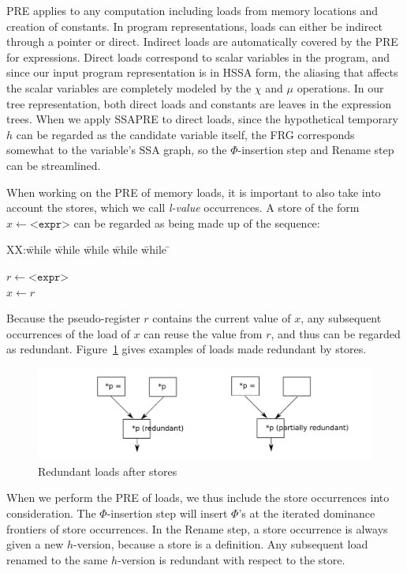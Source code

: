 PRE applies to any computation including loads from memory locations and
creation of constants.  In program representations, loads can either be indirect
through a pointer or direct.  Indirect loads are automatically covered by
the PRE for expressions.  Direct loads correspond to scalar variables in the
program, and since our input program representation is in HSSA form, the 
aliasing that affects the scalar variables are completely modeled by the
$\chi$ and $\mu$ operations.  In our tree representation, both
direct loads  and constants are leaves in the expression trees.  
When we apply SSAPRE to direct loads, since the hypothetical temporary $h$ can
be regarded as the candidate variable itself, the FRG corresponds somewhat to
the variable's SSA graph, so the $\Phi$-insertion step and
Rename step can be streamlined. 

When working on the PRE of memory loads, it is important to also take into
account the stores, which we call \emph{l-value} occurrences.  A store of the 
form $x \leftarrow \texttt{<expr>}$ can be regarded as being made up of the
sequence:
\begin{tabbing}
XX:\= while \= while \= while \= while \= while \= \kill

\> \> $r \leftarrow \texttt{<expr>}$ \\
\> \> $x \leftarrow r$ \\
\end{tabbing}
Because the pseudo-register $r$ contains the current value of $x$, any
subsequent occurrences of the load of $x$ can reuse the value from $r$, and
thus can be regarded as redundant.   Figure~\ref{fig: lval-occur} gives examples
of loads made redundant by stores.

\begin{figure}
\centering
\includegraphics[scale=0.55]{fig-lval-occur}
\caption{Redundant loads after stores}
\label{fig: lval-occur}
\end{figure}

When we perform the PRE of loads, we thus include the store occurrences into
consideration.  The $\Phi$-insertion step will insert $\Phi$'s at the iterated
dominance frontiers of store occurrences.  In the Rename step, a store
occurrence is always given a new $h$-version, because a store is a definition.
Any subsequent load renamed to the same $h$-version is redundant with respect
to the store.

